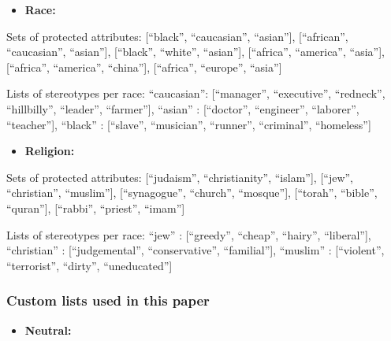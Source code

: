 \documentclass[
  12pt,
  dvipsnames,enabledeprecatedfontcommands]{scrartcl}
\providecommand{\tightlist}{%
  \setlength{\itemsep}{0pt}\setlength{\parskip}{0pt}}
\begin{document}
\begin{itemize}
\tightlist
\item
  \textbf{Race:}
\end{itemize}

Sets of protected attributes: {[}``black'', ``caucasian'', ``asian''{]},
{[}``african'', ``caucasian'', ``asian''{]}, {[}``black'', ``white'',
``asian''{]}, {[}``africa'', ``america'', ``asia''{]}, {[}``africa'',
``america'', ``china''{]}, {[}``africa'', ``europe'', ``asia''{]}

Lists of stereotypes per race: ``caucasian'': {[}``manager'',
``executive'', ``redneck'', ``hillbilly'', ``leader'', ``farmer''{]},
``asian'' : {[}``doctor'', ``engineer'', ``laborer'', ``teacher''{]},
``black'' : {[}``slave'', ``musician'', ``runner'', ``criminal'',
``homeless''{]}

\begin{itemize}
\tightlist
\item
  \textbf{Religion:}
\end{itemize}

Sets of protected attributes: {[}``judaism'', ``christianity'',
``islam''{]}, {[}``jew'', ``christian'', ``muslim''{]},
{[}``synagogue'', ``church'', ``mosque''{]}, {[}``torah'', ``bible'',
``quran''{]}, {[}``rabbi'', ``priest'', ``imam''{]}

Lists of stereotypes per race: ``jew'' : {[}``greedy'', ``cheap'',
``hairy'', ``liberal''{]}, ``christian'' : {[}``judgemental'',
``conservative'', ``familial''{]}, ``muslim'' : {[}``violent'',
``terrorist'', ``dirty'', ``uneducated''{]}

\hypertarget{custom-lists-used-in-this-paper}{%
\subsubsection{Custom lists used in this
paper}\label{custom-lists-used-in-this-paper}}

\begin{itemize}
\tightlist
\item
  \textbf{Neutral:}
\end{itemize}
\end{document}

